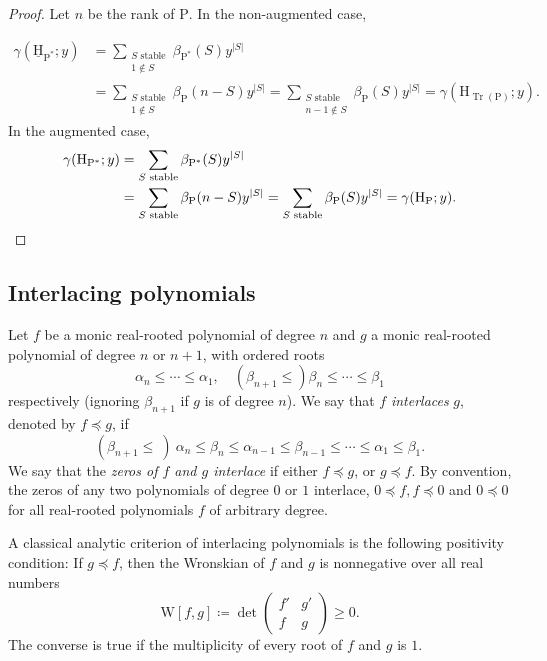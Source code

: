 \documentclass[11pt,a4paper]{amsart}
\theoremstyle{results}
\theoremstyle{definitions}
\def\P{\mathbb{P}}
\newcommand{\uH}{\underline{\mathrm{H}}}
\newcommand{\Tr}{\operatorname{Tr}}
\newcommand{\Pdual}{\P^{\ast}}
\renewcommand{\P}{\mathrm{P}}
\renewcommand{\H}{\mathrm{H}}
\begin{document}
\begin{proof}
Let $n$ be the rank of $\P$. In the non-augmented case,  

\begin{align*}   
\gamma(\uH_{\Pdual};y) &= \sum_{\substack{S \textrm{ stable}\\ 1 \notin S}}\beta_{\Pdual}(S)y^{|S|} \\
    &= \sum_{\substack{S \textrm{ stable}\\ 1 \notin S}}\beta_{\P}(n-S)y^{|S|} 
    =\sum_{\substack{S \textrm{ stable}\\ n-1 \notin S}}\beta_{\P}(S)y^{|S|} 
    = \gamma(\H_{\Tr(\P)}; y).
\end{align*}
In the augmented case,  
\begin{align*}
    \gamma(\H_{\Pdual};y) 
    &= \sum_{S \textrm{ stable}}\beta_{\Pdual}(S)y^{|S|}\\  
    &= \sum_{S \textrm{ stable}}\beta_{\P}(n-S)y^{|S|} 
    =\sum_{S \textrm{ stable}}\beta_{\P}(S)y^{|S|} 
    = \gamma(\H_{\P}; y).\qedhere
\end{align*} 
\end{proof}

\subsection{Interlacing polynomials}
Let $f$ be a monic real-rooted polynomial of degree $n$ and $g$ a monic real-rooted polynomial of degree $n$ or $n+1$, with ordered roots
\[
\alpha_n \leqslant \cdots \leqslant \alpha_1, \quad (\beta_{n+1} \leqslant) \beta_n \leqslant \cdots \leqslant \beta_1
\]
respectively (ignoring $\beta_{n+1}$ if $g$ is of degree $n$). We say that $f$ \emph{interlaces} $g$, denoted by $f \preceq g$, if
\[
(\beta_{n+1} \leqslant \: ) \: \alpha_n \leqslant \beta_n \leqslant \alpha_{n-1} \leqslant \beta_{n-1} \leqslant \cdots \leqslant \alpha_1 \leqslant \beta_1.
\]
We say that the \emph{zeros of $f$ and $g$ interlace} if either $f \preceq g$, or $g \preceq f$. By convention, the zeros of any two polynomials of degree $0$ or $1$ interlace, $0 \preceq f, f \preceq 0$ and $0 \preceq 0$ for all real-rooted polynomials $f$ of arbitrary degree. 

A classical analytic criterion of interlacing polynomials is the following positivity condition: If $g \preceq f$, then the Wronskian of $f$ and $g$ is nonnegative over all real numbers
\[
\textrm{W}[f, g] \coloneqq \det \begin{pmatrix} 
f' & g' \\
f  & g 
\end{pmatrix} \geqslant 0. 
\] The converse is true if the multiplicity of every root of $f$ and $g$ is $1$. 
\end{document}
